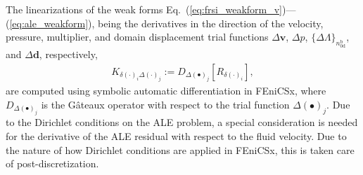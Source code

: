 The linearizations of the weak forms Eq.~(\ref{eq:frsi_weakform_v})---(\ref{eq:ale_weakform}), being the derivatives in the direction of the velocity, pressure, multiplier, and domain displacement trial functions $\Delta\boldsymbol{v}$, $\Delta p$, $\{\Delta\mathit{\Lambda}\}_{n_{\mathrm{0d}}^{\mathrm{b}}}$, and $\Delta\boldsymbol{d}$, respectively, 
\begin{align}
    K_{\delta (\cdot)_{i} \Delta (\cdot)_{j}} := D_{\Delta (\bullet)_{j}} \left[R_{\delta (\cdot)_{i}}\right], \label{eq:linearizations}
\end{align}
are computed using symbolic automatic differentiation in FEniCSx, where $D_{\Delta (\bullet)_{j}}$ is the G{\^a}teaux operator with respect to the trial function $\Delta (\bullet)_{j}$. Due to the Dirichlet conditions on the ALE problem, a special consideration is needed for the derivative of the ALE residual with respect to the fluid velocity. Due to the nature of how Dirichlet conditions are applied in FEniCSx, this is taken care of post-discretization.

